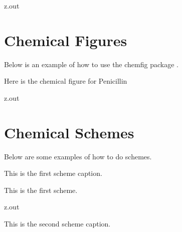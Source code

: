\MyIO


\begin{VerbatimOut}{z.out}


\section{Chemical Figures}

Below is an example of how to use the chemfig package
\cite{tellechea2021}.

Here is the chemical figure
for Penicillin
\cite[pages~72--73]{tellechea2021}\\

\end{VerbatimOut}

\MyIO


\begin{VerbatimOut}{z.out}
\newpage
\section{Chemical Schemes}

Below are some examples of how to do schemes.

\begin{scheme}[ht]
  \caption{This is the first scheme caption.}
  \vspace*{6pt}
  \begin{center}
    This is the first scheme.
  \end{center}
\end{scheme}
\end{VerbatimOut}

\MyIO


\begin{VerbatimOut}{z.out}
\begin{scheme}[ht]
  \caption{This is the second scheme caption.}
  \vspace*{6pt}
  \begin{center}
    \scriptsize{}
    \schemestart
      \arrow
    \schemestop
  \end{center}
\end{scheme}
\end{VerbatimOut}

